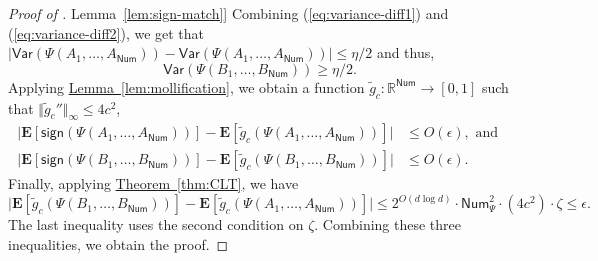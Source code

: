 \documentclass[11pt]{article}
\numberwithin{equation}{section}
\theoremstyle{definition}
\theoremstyle{plain}
\newcommand{\expref}[2]{\hyperref[#2]{#1~\ref{#2}}}
\begin{document}
\begin{proof}[Proof of \expref{Lemma}{lem:sign-match}]
Combining (\ref{eq:variance-diff1}) and (\ref{eq:variance-diff2}), we get that 
$
|\mathsf{Var}(\Psi(A_1, \ldots, A_{\mathsf{Num}})) - \mathsf{Var}(\Psi(A_1, \ldots, A_{\mathsf{Num}}))| \le \eta/2
$ and thus, $$\mathsf{Var}(\Psi(B_1, \ldots, B_{\mathsf{Num}})) \ge \eta/2.$$
Applying \expref{Lemma}{lem:mollification}, we obtain a function
$\tilde{g}_c : \mathbb{R}^{\mathsf{Num}} \rightarrow [0,1]$ such that
$\Vert \tilde{g}_c'' \Vert_{\infty} \le 4c^2$,
\begin{align*}
    \big|\mathbf{E} [ \mathsf{sign}(\Psi(A_1, \ldots, A_{\mathsf{Num}}))]  - \mathbf{E} [ \tilde{g}_c(\Psi(A_1, \ldots, A_{\mathsf{Num}}))] \big| &\le O(\epsilon), \text{ and } \\
    \big|\mathbf{E} [ \mathsf{sign}(\Psi(B_1, \ldots, B_{\mathsf{Num}}))]  - \mathbf{E} [ \tilde{g}_c(\Psi(B_1, \ldots, B_{\mathsf{Num}}))] \big| &\le O(\epsilon).
\end{align*}
Finally, applying \expref{Theorem}{thm:CLT}, we have 
\[
\big| \mathbf{E} [ \tilde{g}_c(\Psi(B_1, \ldots, B_{\mathsf{Num}}))]- \mathbf{E} [ \tilde{g}_c(\Psi(A_1, \ldots, A_{\mathsf{Num}}))] \big| \le 2^{O(d \log d)} \cdot \mathsf{Num}_\Psi^2 \cdot (4c^2) \cdot \zeta \le \epsilon.
\]
The last inequality uses the second condition on $\zeta$.  Combining these three inequalities, we obtain the proof. 
\end{proof}
\end{document}
